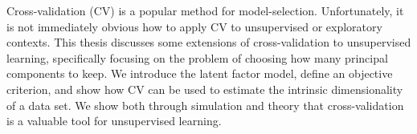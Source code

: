 Cross-validation (CV) is a popular method for model-selection.  Unfortunately, it is not immediately obvious how to apply CV to unsupervised or exploratory contexts.  This thesis discusses some extensions of cross-validation to unsupervised learning, specifically focusing on the problem of choosing how many principal components to keep.  We introduce the latent factor model, define an objective criterion, and show how CV can be used to estimate the intrinsic dimensionality of a data set.  We show both through simulation and theory that cross-validation is a valuable tool for unsupervised learning.

